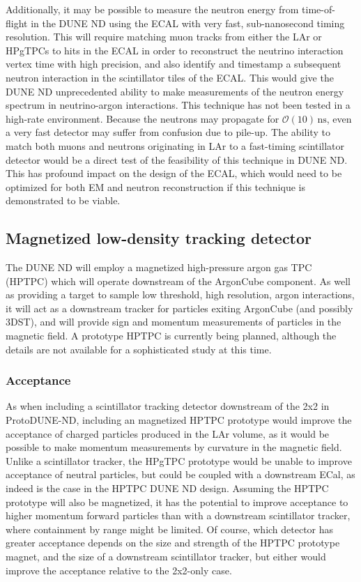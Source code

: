 Additionally, it may be possible to measure the neutron energy from time-of-flight in the DUNE ND using the ECAL with very fast, sub-nanosecond timing resolution. This will require matching muon tracks from either the LAr or HPgTPCs to hits in the ECAL in order to reconstruct the neutrino interaction vertex time with high precision, and also identify and timestamp a subsequent neutron interaction in the scintillator tiles of the ECAL. This would give the DUNE ND unprecedented ability to make measurements of the neutron energy spectrum in neutrino-argon interactions. This technique has not been tested in a high-rate environment. Because the neutrons may propagate for $\mathcal{O}\left(10\right)\,\mathrm{ns}$, even a very fast detector may suffer from confusion due to pile-up. The ability to match both muons and neutrons originating in LAr to a fast-timing scintillator detector would be a direct test of the feasibility of this technique in DUNE ND. This has profound impact on the design of the ECAL, which would need to be optimized for both EM and neutron reconstruction if this technique is demonstrated to be viable.
 
\subsection{Magnetized low-density tracking detector}
The DUNE ND will employ a magnetized high-pressure argon gas TPC (HPTPC) which will operate downstream of the ArgonCube component. As well as providing a target to sample low threshold, high resolution, argon interactions, it will act as a downstream tracker for particles exiting ArgonCube (and possibly 3DST), and will provide sign and momentum measurements of particles in the magnetic field. A prototype HPTPC is currently being planned, although the details are not available for a sophisticated study at this time.

\subsubsection{Acceptance}
As when including a scintillator tracking detector downstream of the 2x2 in ProtoDUNE-ND, including an magnetized HPTPC prototype would improve the acceptance of charged particles produced in the LAr volume, as it would be possible to make momentum measurements by curvature in the magnetic field. Unlike a scintillator tracker, the HPgTPC prototype would be unable to improve acceptance of neutral particles, but could be coupled with a downstream ECal, as indeed is the case in the HPTPC DUNE ND design. Assuming the HPTPC prototype will also be magnetized, it has the potential to improve acceptance to higher momentum forward particles than with a downstream scintillator tracker, where containment by range might be limited. Of course, which detector has greater acceptance depends on the size and strength of the HPTPC prototype magnet, and the size of a downstream scintillator tracker, but either would improve the acceptance relative to the 2x2-only case.

